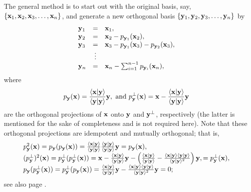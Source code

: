 The general method is to start out with the original basis,
say,
$\{
{\bf x}_1,
{\bf x}_2,
{\bf x}_3,
\ldots ,
{\bf x}_n
\}$,
and generate a new orthogonal basis
$\{
{\bf y}_1,
{\bf y}_2,
{\bf y}_3,
\ldots ,
{\bf y}_n
\}$
by
\begin{equation}
\begin{array}{lcl}
{\bf y}_1&=&{\bf x}_1,\\
{\bf y}_2&=&{\bf x}_2 - p_{{\bf y}_1}({\bf x}_2),\\
{\bf y}_3&=&{\bf x}_3 - p_{{\bf y}_1}({\bf x}_3)- p_{{\bf y}_2}({\bf x}_3),\\
&\vdots&\\
{\bf y}_n&=&{\bf x}_n -\sum_{i=1}^{n-1} p_{{\bf y}_i}({\bf x}_n),
\end{array}
\end{equation}
where
\begin{equation}
p_{{\bf y}}({\bf x}) =
\frac{\langle {\bf x}\vert {\bf y} \rangle }
{\langle {\bf y}\vert {\bf y} \rangle }
{\bf y}
,\textrm{ and }
p_{{\bf y}}^\perp ({\bf x}) = {\bf x} -
\frac{\langle {\bf x}\vert {\bf y} \rangle }
{\langle {\bf y}\vert {\bf y} \rangle }
{\bf y}
\end{equation}
are the orthogonal projections of ${\bf x}$ onto ${\bf y}$ and ${\bf y}^\perp$, respectively
(the latter is mentioned for the sake of completeness and is not required here).
\label{2011-m-gsp}
Note that these orthogonal projections are idempotent
and mutually orthogonal; that is,
\begin{equation}
\begin{array}{l}
p_{{\bf y}}^2({\bf x})  = p_{{\bf y}}(p_{{\bf y}}({\bf x}) ) =
\frac{\langle {\bf x}\vert {\bf y} \rangle }
{\langle {\bf y}\vert {\bf y} \rangle }
\frac{\langle {\bf y}\vert {\bf y} \rangle }
{\langle {\bf y}\vert {\bf y} \rangle }
{\bf y} =p_{{\bf y}}({\bf x}),  \\
%
(p_{{\bf y}}^\perp)^2({\bf x})  = p_{{\bf y}}^\perp(p_{{\bf y}}^\perp({\bf x}) ) =
{\bf x}- \frac{\langle {\bf x}\vert {\bf y} \rangle }{\langle {\bf y}\vert {\bf y} \rangle }{\bf y}
-\left(
\frac{\langle {\bf x}\vert {\bf y} \rangle }{\langle {\bf y}\vert {\bf y} \rangle }
-
\frac{\langle {\bf x}\vert {\bf y} \rangle \langle {\bf y}\vert {\bf y} \rangle}{\langle {\bf y}\vert {\bf y} \rangle^2 }
\right)
{\bf y},
=p_{{\bf y}}^\perp({\bf x}),  \\
p_{{\bf y}}(p_{{\bf y}}^\perp({\bf x}) ) =  p_{{\bf y}}^\perp(p_{{\bf y}}({\bf x}) ) =
\frac{\langle {\bf x}\vert {\bf y} \rangle }{\langle {\bf y}\vert {\bf y} \rangle }{\bf y}
-
\frac{\langle {\bf x}\vert {\bf y} \rangle \langle {\bf y}\vert {\bf y} \rangle}{\langle {\bf y}\vert {\bf y} \rangle^2 }
{\bf y}
=0;
\end{array}
\end{equation}
see also page \pageref{2011-m-projec}.

